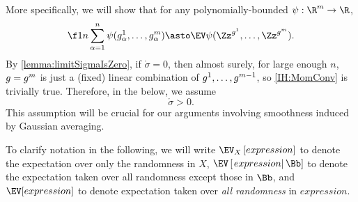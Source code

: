 \documentclass[main.tex]{subfiles}
\begin{document}
More specifically,
we will show that for any polynomially-bounded $\psi: \R^{\MM} \to \R$,
\begin{align*}
    \f 1 n \sum_{\alpha=1}^n \psi(g^1_\alpha, \ldots, g^{\MM}_\alpha) 
    \asto
    \EV \psi(\Zz^{g^1}, \ldots, \Zz^{g^\MM})
    .
\end{align*}
By \cref{lemma:limitSigmaIsZero}, if $\mathring \sigma = 0$, then almost surely, for large enough $n$, $g = g^m$ is just a (fixed) linear combination of $g^1, \ldots, g^{m-1}$, so \ref{IH:MomConv} is trivially true.
Therefore, in the below, we assume 
\begin{equation}
\mathring \sigma > 0.
\label{assm:mathringSigmaPositive}
\tag{$\star$}
\end{equation}
This assumption will be crucial for our arguments involving smoothness induced by Gaussian averaging.

\newcommand{\probA}{\mathsf{A}}
\newcommand{\probB}{\mathsf{B}}
\newcommand{\probC}{\mathsf{C}}
\newcommand{\probD}{\mathsf{D}}

\newcommand{\EVbr}[2][]{\EV_{#1}\left[#2\right]}
\newcommand{\EVcond}[2]{\EV\left[\left.#1\right| #2 \right]}
\newcommand{\extcom}[1]{{\color{blue}{#1}}}
\newcommand{\exttcom}[1]{{\color{olive}{#1}}}

To clarify notation in the following, we will write $\EVbr[X]{expression}$ to denote the expectation over only the randomness in $X$, $\EVcond{expression}{\Bb}$ to denote the expectation taken over all randomness except those in $\Bb$, and $\EV[expression]$ to denote expectation taken over \emph{all randomness} in $expression$.
\end{document}

